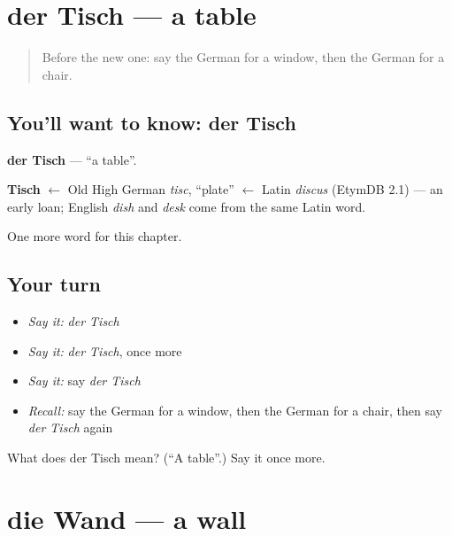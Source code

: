 \section[der Tisch]{der Tisch — a table}

\label{lesson:GE-C76-tisch}



\begin{quote}
Before the new one: say the German for a window, then the German for a chair.
\end{quote}

\subsection*{You'll want to know: der Tisch}
\textbf{der Tisch} — \textquotedblleft{}a table\textquotedblright{}.

\begin{cousinweb}
\textbf{Tisch} $\leftarrow$ Old High German \emph{tisc}, \textquotedblleft{}plate\textquotedblright{} $\leftarrow$ Latin \emph{discus} (EtymDB 2.1) — an early loan; English \emph{dish} and \emph{desk} come from the same Latin word.
\end{cousinweb}

\begin{grammarlens}[title={What you've built}]
One more word for this chapter.
\end{grammarlens}

\subsection*{Your turn}
\begin{itemize}
\raggedright
  \item \emph{Say it:} \emph{der Tisch}
  \item \emph{Say it:} \emph{der Tisch}, once more
  \item \emph{Say it:} say \emph{der Tisch}
  \item \emph{Recall:} say the German for a window, then the German for a chair, then say \emph{der Tisch} again
\end{itemize}

\begin{tcolorbox}[breakable,colback=teal!4,colframe=teal!35!black,title={Before you move on}]
What does der Tisch mean? (\textquotedblleft{}A table\textquotedblright{}.) Say it once more.
\end{tcolorbox}
\section[die Wand]{die Wand — a wall}

